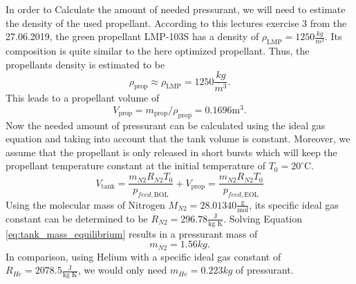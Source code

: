 \documentclass[12pt]{article}
\begin{document}
In order to Calculate the amount of needed pressurant, we will need to estimate the density of the used propellant. According to this lectures exercise 3 from the 27.06.2019, the green propellant LMP-103S has a density of $\rho_{\text{LMP}}=1250 \frac{kg}{m^3}$. Its composition is quite similar to the here optimized propellant. Thus, the propellants density is estimated to be
\begin{equation*}
	\rho_{\text{prop}} \approx \rho_{\text{LMP}}=1250 \frac{kg}{m^3}.
\end{equation*}
This leads to a propellant volume of 
\begin{equation*}
V_{\text{prop}} = m_{\text{prop}} / \rho_{\text{prop}} = 0.1696 \text{m}^3.
\end{equation*}
Now the needed amount of pressurant can be calculated using the ideal gas equation and taking into account that the tank volume is constant. Moreover, we assume that the propellant is only released in short bursts which will keep the propellant temperature constant at the initial temperature of $T_0=20^\circ\text{C}$.
\begin{equation}
V_{\text{tank}} = \frac{m_{N2} R_{N2} T_0}{p_{feed,\text{BOL}}} + V_{\text{prop}} = \frac{m_{N2} R_{N2} T_0}{p_{feed,\text{EOL}}}
\label{eq:tank_mass_equilibrium}
\end{equation}
Using the molecular mass of Nitrogen $M_{N2}=28.01340\frac{\text{g}}{\text{mol}}$, its specific ideal gas constant can be determined to be $R_{N2}=296.78 \frac{\text{J}}{\text{kg K}}$.
Solving Equation \ref{eq:tank_mass_equilibrium} results in a pressurant mass of
\begin{equation*}
	m_{N2} = 1.56kg.
\end{equation*}
In comparison, using Helium with a specific ideal gas constant of $R_{He}=2078.5 \frac{\text{J}}{\text{kg K}}$, we would only need $m_{He}=0.223kg$ of pressurant.\\
\end{document}
